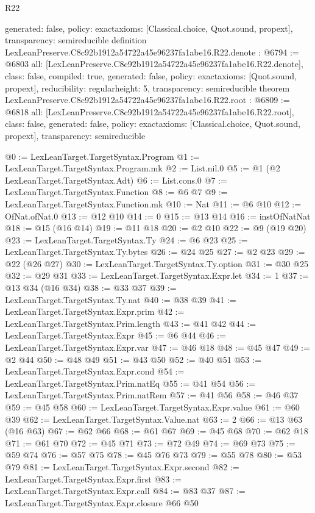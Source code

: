 \begin{lexlean}{R22}
\begin{coremodule}
{  generated: false,
  policy: exact{axioms: [Classical.choice, Quot.sound, propext]},
  transparency: semireducible
}
definition LexLeanPreserve.C8c92b1912a54722a45e96237fa1abe16.R22.denote : @6794 := @6803 {
  all: [LexLeanPreserve.C8c92b1912a54722a45e96237fa1abe16.R22.denote],
  class: false,
  compiled: true,
  generated: false,
  policy: exact{axioms: [Quot.sound, propext]},
  reducibility: regular{height: 5},
  transparency: semireducible
}
theorem LexLeanPreserve.C8c92b1912a54722a45e96237fa1abe16.R22.root : @6809 := @6818 {
  all: [LexLeanPreserve.C8c92b1912a54722a45e96237fa1abe16.R22.root],
  class: false,
  generated: false,
  policy: exact{axioms: [Classical.choice, Quot.sound, propext]},
  transparency: semireducible
}

@0 := LexLeanTarget.TargetSyntax.Program
@1 := LexLeanTarget.TargetSyntax.Program.mk
@2 := List.nil.{0}
@5 := @1 (@2 LexLeanTarget.TargetSyntax.Adt)
@6 := List.cons.{0}
@7 := LexLeanTarget.TargetSyntax.Function
@8 := @6 @7
@9 := LexLeanTarget.TargetSyntax.Function.mk
@10 := Nat
@11 := @6 @10
@12 := OfNat.ofNat.{0}
@13 := @12 @10
@14 := 0
@15 := @13 @14
@16 := instOfNatNat
@18 := @15 (@16 @14)
@19 := @11 @18
@20 := @2 @10
@22 := @9 (@19 @20)
@23 := LexLeanTarget.TargetSyntax.Ty
@24 := @6 @23
@25 := LexLeanTarget.TargetSyntax.Ty.bytes
@26 := @24 @25
@27 := @2 @23
@29 := @22 (@26 @27)
@30 := LexLeanTarget.TargetSyntax.Ty.option
@31 := @30 @25
@32 := @29 @31
@33 := LexLeanTarget.TargetSyntax.Expr.let
@34 := 1
@37 := @13 @34 (@16 @34)
@38 := @33 @37
@39 := LexLeanTarget.TargetSyntax.Ty.nat
@40 := @38 @39
@41 := LexLeanTarget.TargetSyntax.Expr.prim
@42 := LexLeanTarget.TargetSyntax.Prim.length
@43 := @41 @42
@44 := LexLeanTarget.TargetSyntax.Expr
@45 := @6 @44
@46 := LexLeanTarget.TargetSyntax.Expr.var
@47 := @46 @18
@48 := @45 @47
@49 := @2 @44
@50 := @48 @49
@51 := @43 @50
@52 := @40 @51
@53 := LexLeanTarget.TargetSyntax.Expr.cond
@54 := LexLeanTarget.TargetSyntax.Prim.natEq
@55 := @41 @54
@56 := LexLeanTarget.TargetSyntax.Prim.natRem
@57 := @41 @56
@58 := @46 @37
@59 := @45 @58
@60 := LexLeanTarget.TargetSyntax.Expr.value
@61 := @60 @39
@62 := LexLeanTarget.TargetSyntax.Value.nat
@63 := 2
@66 := @13 @63 (@16 @63)
@67 := @62 @66
@68 := @61 @67
@69 := @45 @68
@70 := @62 @18
@71 := @61 @70
@72 := @45 @71
@73 := @72 @49
@74 := @69 @73
@75 := @59 @74
@76 := @57 @75
@78 := @45 @76 @73
@79 := @55 @78
@80 := @53 @79
@81 := LexLeanTarget.TargetSyntax.Expr.second
@82 := LexLeanTarget.TargetSyntax.Expr.first
@83 := LexLeanTarget.TargetSyntax.Expr.call
@84 := @83 @37
@87 := LexLeanTarget.TargetSyntax.Expr.closure @66 @50

\end{coremodule}
\end{lexlean}
